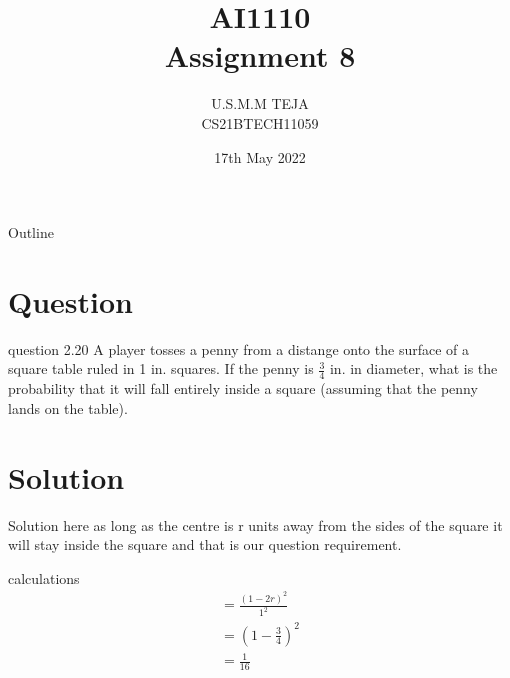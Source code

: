 \documentclass{beamer}
\title{AI1110 \\ Assignment 8}
\author{U.S.M.M TEJA \\ CS21BTECH11059}
\date{17th May 2022}
\begin{document}
	\begin{frame}
		\titlepage
	\end{frame}
	
	\begin{frame}{Outline}
    		\tableofcontents
	\end{frame}
	
	\section{Question}
	\begin{frame}{question 2.20}
A player tosses a penny from a distange onto the surface of a square table ruled in 1 in.
squares. If the penny is $\frac{3}{4}$ in. in diameter, what is the probability that it will fall entirely
inside a square (assuming that the penny lands on the table).
	\end{frame}
	
	\section{Solution}
	\begin{frame}{Solution}
here as long as the centre is r units away from the sides of the square it will stay inside the square and that is our question requirement.
    \end{frame}

\begin{frame}{calculations}
 \begin{align}
    & =\frac{(1-2r)^2}{1^2} & \\
    & = (1 - \frac{3}{4})^2& \\
    & = \frac{1}{16}&
\end{align}   
\end{frame}
\end{document}
